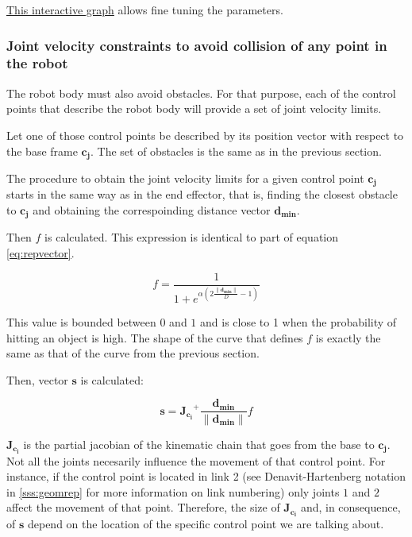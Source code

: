 \href{https://www.desmos.com/calculator/9f1iszpe5j}{This interactive graph} allows fine tuning the parameters.







\subsubsection{Joint velocity constraints to avoid collision of any point in the robot}
\label{sss:flaccobody}

The robot body must also avoid obstacles. For that purpose, each of the control points that describe the robot body will provide a set of joint velocity limits.

Let one of those control points be described by its position vector with respect to the base frame $\mathbf{c_{j}}$. The set of obstacles is the same as in the previous section.

The procedure to obtain the joint velocity limits for a given control point $\mathbf{c_{j}}$ starts in the same way as in the end effector, that is, finding the closest obstacle to $\mathbf{c_{j}}$ and obtaining the correspoinding distance vector $\mathbf{d_{min}}$.

Then $f$ is calculated. This expression is identical to part of equation \ref{eq:repvector}.

$$
f = \frac{1}{1 + e^{\alpha (2 \frac{\|\mathbf{d_{min}}\|}{D} - 1)}}
$$

This value is bounded between $0$ and $1$ and is close to 1 when the probability of hitting an object is high. The shape of the curve that defines $f$ is exactly the same as  that of the curve from the previous section.

Then, vector $\mathbf{s}$ is calculated:

$$
\mathbf{s} = \mathbf{J_{c_i}}^{+} \frac{\mathbf{d_{min}}}{\|\mathbf{d_{min}}\|} f
$$

$\mathbf{J_{c_i}}$ is the partial jacobian of the kinematic chain that goes from the base to $\mathbf{c_{j}}$. Not all the joints necesarily influence the movement of that control point. For instance, if the control point is located in link 2 (see Denavit-Hartenberg notation in \ref{sss:geomrep} for more information on link numbering) only joints $1$ and $2$ affect the movement of that point. Therefore, the size of $\mathbf{J_{c_i}}$ and, in consequence, of $\mathbf{s}$ depend on the location of the specific control point we are talking about.

